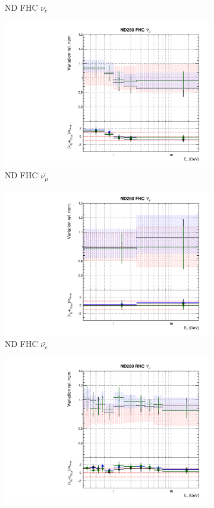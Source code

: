 \begin{figure}
\begin{subfigure}{0.24\textwidth}
  \caption{ND FHC $\nu_e$}
\end{subfigure}
\begin{subfigure}{0.24\textwidth}
  \centering
  \includegraphics[width=0.95\linewidth]{figs/fgdfitsflux_2}
  \caption{ND FHC $\bar{\nu_{\mu}}$}
\end{subfigure}
\begin{subfigure}{0.24\textwidth}
  \centering
  \includegraphics[width=0.95\linewidth]{figs/fgdfitsflux_3}
  \caption{ND FHC $\bar{\nu_{e}}$}  
\end{subfigure}
\begin{subfigure}{0.24\textwidth}
  \centering
  \includegraphics[width=0.95\linewidth]{figs/fgdfitsflux_4}

\end{subfigure}
\end{figure}
